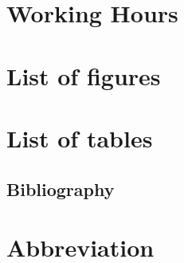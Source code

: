 \singlespacing    %

\section{Working Hours}
    
\pagebreak

\section{List of figures}
{\def\section*#1{}\listoffigures}
\pagebreak

\section{List of tables}
    {\def\section*#1{}\listoftables}
\pagebreak

\begin{flushleft}
        \section{Bibliography}
    \renewcommand{\headrulewidth}{0.4pt}
    {\def\section*#1{}\printbibliography}
\end{flushleft}
\newpage

\section{Abbreviation}
